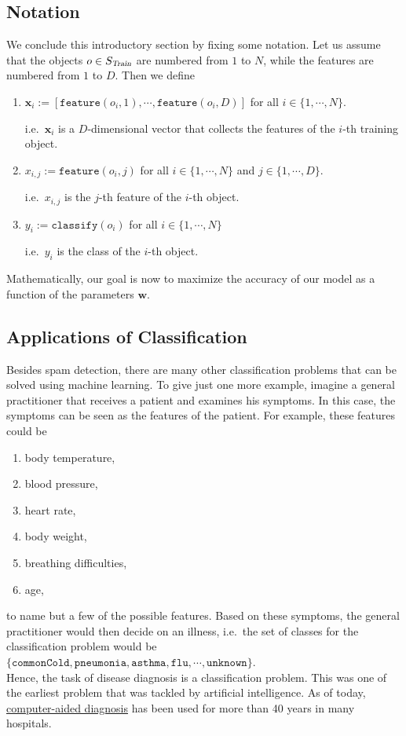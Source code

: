 \subsection{Notation}
We conclude this introductory section by fixing some notation.  Let us assume that the objects $o \in S_\textsl{Train}$
are numbered 
from $1$ to $N$, while the features are numbered from $1$ to $D$.  Then we define
\begin{enumerate}
\item $\textbf{x}_i := [\mathtt{feature}(o_i, 1), \cdots, \mathtt{feature}(o_i, D)]$ \quad for all $i \in \{1, \cdots, N\}$.
  
      i.e.~$\mathbf{x}_i$ is a $D$-dimensional vector that collects the features of the $i$-th training object.
\item $x_{i,j} := \mathtt{feature}(o_i, j)$ \quad for all $i \in \{1, \cdots, N\}$ and $j \in \{1, \cdots, D\}$.

      i.e.~$x_{i,j}$ is the $j$-th feature of the $i$-th object.
\item $y_i := \mathtt{classify}(o_i)$ \quad for all $i \in \{1, \cdots, N\}$

      i.e.~$y_i$ is the class of the $i$-th object.
\end{enumerate}
Mathematically, our goal is now to maximize the accuracy of our model as a function of the parameters $\mathbf{w}$.

\subsection{Applications of Classification}
Besides spam detection, there are many other classification problems that can be solved using machine learning.  To give
just one more example, imagine a general practitioner that receives a patient and examines his symptoms.  In this case,
the symptoms can be seen as the features of the patient.  For example, these features could be
\begin{enumerate}
\item body temperature,
\item blood pressure,
\item heart rate,
\item body weight,
\item breathing difficulties,
\item age,
\end{enumerate}
to name but a few of the possible features.  Based on these symptoms, the general practitioner would then decide on an
illness, i.e.~the set of classes for the classification problem would be
\\[0.2cm]
\hspace*{1.3cm}
$\{ \mathtt{commonCold}, \mathtt{pneumonia}, \mathtt{asthma}, \mathtt{flu}, \cdots, \mathtt{unknown} \}$.
\\[0.2cm]
Hence, the task of disease diagnosis is a classification problem.  This was one of the earliest problem that was tackled
by artificial intelligence.  As of today, 
\href{https://en.wikipedia.org/wiki/Computer-aided_diagnosis}{computer-aided diagnosis} has been used for more than 40
years in many hospitals. 

